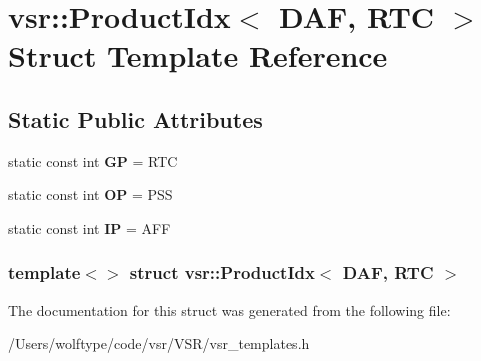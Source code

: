 \hypertarget{structvsr_1_1_product_idx_3_01_d_a_f_00_01_r_t_c_01_4}{\section{vsr\-:\-:Product\-Idx$<$ D\-A\-F, R\-T\-C $>$ Struct Template Reference}
\label{structvsr_1_1_product_idx_3_01_d_a_f_00_01_r_t_c_01_4}
}
\subsection*{Static Public Attributes}
\begin{DoxyCompactItemize}
\item 
\hypertarget{structvsr_1_1_product_idx_3_01_d_a_f_00_01_r_t_c_01_4_aa52f6ff4e1b6c4398b0655277b787151}{static const int {\bfseries G\-P} = R\-T\-C}\label{structvsr_1_1_product_idx_3_01_d_a_f_00_01_r_t_c_01_4_aa52f6ff4e1b6c4398b0655277b787151}

\item 
\hypertarget{structvsr_1_1_product_idx_3_01_d_a_f_00_01_r_t_c_01_4_a891b7a0eaae3c71cbb284c9d3e05bd57}{static const int {\bfseries O\-P} = P\-S\-S}\label{structvsr_1_1_product_idx_3_01_d_a_f_00_01_r_t_c_01_4_a891b7a0eaae3c71cbb284c9d3e05bd57}

\item 
\hypertarget{structvsr_1_1_product_idx_3_01_d_a_f_00_01_r_t_c_01_4_a7324a32f6d48f1968ac684ffde9fe953}{static const int {\bfseries I\-P} = A\-F\-F}\label{structvsr_1_1_product_idx_3_01_d_a_f_00_01_r_t_c_01_4_a7324a32f6d48f1968ac684ffde9fe953}

\end{DoxyCompactItemize}
\subsubsection*{template$<$$>$ struct vsr\-::\-Product\-Idx$<$ D\-A\-F, R\-T\-C $>$}



The documentation for this struct was generated from the following file\-:\begin{DoxyCompactItemize}
\item 
/\-Users/wolftype/code/vsr/\-V\-S\-R/vsr\-\_\-templates.\-h\end{DoxyCompactItemize}
